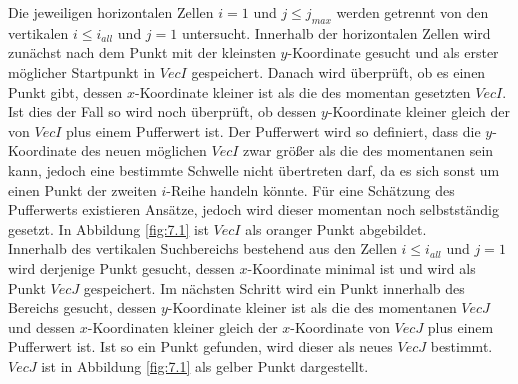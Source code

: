 %
%
Die jeweiligen horizontalen Zellen $i = 1$ und $j \leq  j_{max}$ werden getrennt von den vertikalen $i \leq i_{all}$ und $j = 1$ untersucht. Innerhalb der horizontalen Zellen wird zunächst nach dem Punkt mit der kleinsten $y$-Koordinate gesucht und als erster möglicher Startpunkt in $VecI$ gespeichert. Danach wird überprüft, ob es einen Punkt gibt, dessen $x$-Koordinate kleiner ist als die des momentan gesetzten $VecI$. Ist dies der Fall so wird noch überprüft, ob dessen $y$-Koordinate kleiner gleich der von $VecI$ plus einem Pufferwert ist. Der Pufferwert wird so definiert, dass die $y$-Koordinate des neuen möglichen $VecI$ zwar größer als die des momentanen sein kann, jedoch eine bestimmte Schwelle nicht übertreten darf, da es sich sonst um einen Punkt der zweiten $i$-Reihe handeln könnte. Für eine Schätzung des Pufferwerts existieren Ansätze, jedoch wird dieser momentan noch selbstständig gesetzt. In Abbildung \ref{fig:7.1} ist $VecI$ als oranger Punkt abgebildet.\\

Innerhalb des vertikalen Suchbereichs bestehend aus den Zellen  $i \leq i_{all}$ und $j = 1$ wird derjenige Punkt gesucht, dessen $x$-Koordinate minimal ist und wird als Punkt $VecJ$ gespeichert. Im nächsten Schritt wird ein Punkt innerhalb des Bereichs gesucht, dessen $y$-Koordinate kleiner ist als die des momentanen $VecJ$ und dessen $x$-Koordinaten kleiner gleich der $x$-Koordinate von $VecJ$ plus einem Pufferwert ist. Ist so ein Punkt gefunden, wird dieser als neues $VecJ$ bestimmt. $VecJ$ ist in Abbildung \ref{fig:7.1} als gelber Punkt dargestellt.\\

%

